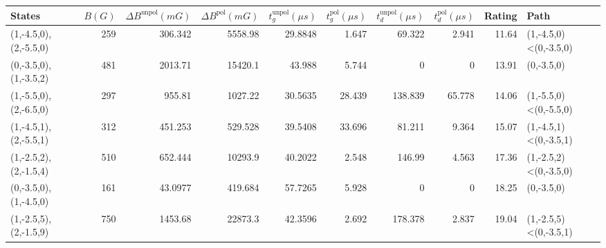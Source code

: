 \begin{tabular}{lrrrrrrrrl}
\hline
 {States}              &   {$B(G)$} &   {$\Delta B^{\text{unpol}}(mG)$} &   {$\Delta B^{\text{pol}}(mG)$} &   {$t^{\text{unpol}}_{g}(\mu s)$} &   {$t^{\text{pol}}_{g}(\mu s)$} &   {$t^{\text{unpol}}_{d}(\mu s)$} &   {$t^{\text{pol}}_{d}(\mu s)$} &   {Rating} & {Path}                     \\
\hline
 (1,-4.5,0),(2,-5.5,0) &        259 &                          306.342  &                        5558.98  &                           29.8848 &                           1.647 &                            69.322 &                           2.941 &      11.64 & (1,-4.5,0)<(0,-3.5,0)      \\
 (0,-3.5,0),(1,-3.5,2) &        481 &                         2013.71   &                       15420.1   &                           43.988  &                           5.744 &                             0     &                           0     &      13.91 & (0,-3.5,0)                 \\
 (1,-5.5,0),(2,-6.5,0) &        297 &                          955.81   &                        1027.22  &                           30.5635 &                          28.439 &                           138.839 &                          65.778 &      14.06 & (1,-5.5,0)<(0,-5.5,0)      \\
 (1,-4.5,1),(2,-5.5,1) &        312 &                          451.253  &                         529.528 &                           39.5408 &                          33.696 &                            81.211 &                           9.364 &      15.07 & (1,-4.5,1)<(0,-3.5,1)      \\
 (1,-2.5,2),(2,-1.5,4) &        510 &                          652.444  &                       10293.9   &                           40.2022 &                           2.548 &                           146.99  &                           4.563 &      17.36 & (1,-2.5,2)<(0,-3.5,0)      \\
 (0,-3.5,0),(1,-4.5,0) &        161 &                           43.0977 &                         419.684 &                           57.7265 &                           5.928 &                             0     &                           0     &      18.25 & (0,-3.5,0)                 \\
 (1,-2.5,5),(2,-1.5,9) &        750 &                         1453.68   &                       22873.3   &                           42.3596 &                           2.692 &                           178.378 &                           2.837 &      19.04 & (1,-2.5,5)<(0,-3.5,1)      \\

\end{tabular}
